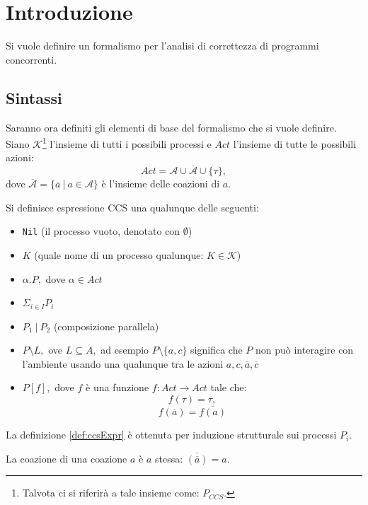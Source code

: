 

\chapter{Introduzione}

Si vuole definire un formalismo per l'analisi di correttezza di programmi concorrenti.

\section{Sintassi}
Saranno ora definiti gli elementi di base del formalismo che si vuole definire.
	Siano $\mathcal{K}$\footnote{Talvota ci si riferir\`a a tale insieme come: $P_{CCS}.$} l'insieme di tutti i possibili processi e $Act$ l'insieme di tutte le possibili azioni: $$ Act=  \mathcal{A} \cup \overline{\mathcal{A}} \cup \{\tau\},$$ dove $\overline{\mathcal{A}} = \{\overline{a}\ |\ a \in \mathcal{A} \}$ \`e l'insieme delle coazioni di $a$.\\
\begin{deff}
	\label{def:ccsExpr}
	Si definisce espressione CCS una qualunque delle seguenti:
	\begin{itemize}
		\item \texttt{Nil} (il processo vuoto, denotato con $\emptyset$)
		\item $K$ (quale nome di un processo qualunque: $K \in \mathcal{K}$)
		\item $\alpha.P,$ dove $\alpha \in Act$
		\item $ \Sigma_{i \in I} P_i$
		\item $P_1\ |\ P_2$ (composizione parallela)
		\item $P \setminus L,$ ove $ L \subseteq A,$ ad esempio $P \setminus \{a, c\} $ significa che $P$ non pu\`o interagire con l'ambiente usando una qualunque tra le azioni $a, c, \overline{a}, \overline{c}$
		\item $P[f],$ dove $f$ \`e una funzione $f: Act \rightarrow Act$ tale che: $$f(\tau)=\tau,$$
		$$f(\overline{a})=\overline{f(a)} $$
	\end{itemize}
\end{deff}
La definizione \ref{def:ccsExpr} \`e ottenuta per induzione strutturale sui processi $P_i$.
\begin{lemma}
La coazione di una coazione $a$ \`e $a$ stessa: $\overline{(\overline{a})}=a.$
\end{lemma}

